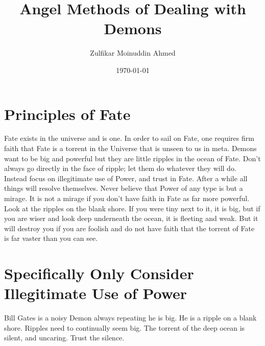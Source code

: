 \documentclass{amsart}
\title{Angel Methods of Dealing with Demons}
\author{Zulfikar Moinuddin Ahmed}
\date{\today}
\begin{document}
\maketitle

\section{Principles of Fate}

Fate exists in the universe and is one.  In order to sail on Fate, one requires firm faith that Fate is a torrent in the Universe that is unseen to us in meta.  Demons want to be big and powerful but they are little ripples in the ocean of Fate.  Don't always go directly in the face of ripple; let them do whatever they will do.  Instead focus on illegitimate use of Power, and trust in Fate.  After a while all things will resolve themselves.  Never believe that Power of any type is but a mirage.  It is not a mirage if you don't have faith in Fate as far more powerful.  Look at the ripples on the blank shore.  If you were tiny next to it, it is big, but if you are wiser and look deep underneath the ocean, it is fleeting and weak.  But it will destroy you if you are foolish and do not have faith that the torrent of Fate is far vaster than you can see.

\section{Specifically Only Consider Illegitimate Use of Power}

Bill Gates is a noisy Demon always repeating he is big.  He is a ripple on a blank shore.  Ripples need to continually seem big.  The torrent of the deep ocean is silent, and uncaring.  Trust the silence.
\end{document}
